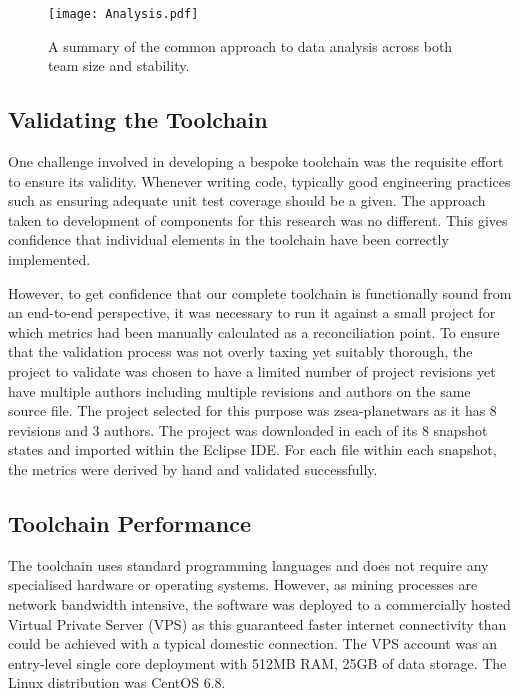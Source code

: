  \begin{figure}[htbp!] 
 \centering    
 \texttt{[image: Analysis.pdf]}
 \caption[A summary of the data analysis approach.]{A summary of the common approach to data analysis across both team size and stability.}
 \label{fig:Analysis}
 \end{figure}

\subsection{Validating the Toolchain}
One challenge involved in developing a bespoke toolchain was the requisite effort to ensure its validity. Whenever writing code, typically good engineering practices such as ensuring adequate unit test coverage should be a given. The approach taken to development of components for this research was no different. This gives confidence that individual elements in the toolchain have been correctly implemented. 

However, to get confidence that our complete toolchain is functionally sound from an end-to-end perspective, it was necessary to run it against a small project for which metrics had been manually calculated as a reconciliation point. To ensure that the validation process was not overly taxing yet suitably thorough, the project to validate was chosen to have a limited number of project revisions yet have multiple authors including multiple revisions and authors on the same source file. The project selected for this purpose was zsea-planetwars as it has 8 revisions and 3 authors. The project was downloaded in each of its 8 snapshot states and imported within the Eclipse IDE. For each file within each snapshot, the metrics were derived by hand and validated successfully.

\subsection{Toolchain Performance}
The toolchain uses standard programming languages and does not require any specialised hardware or operating systems. However, as mining processes are network bandwidth intensive, the software was deployed to a commercially hosted Virtual Private Server (VPS) as this guaranteed faster internet connectivity than could be achieved with a typical domestic connection. The VPS account was an entry-level single core deployment with 512MB RAM, 25GB of data storage. The Linux distribution was CentOS 6.8.

